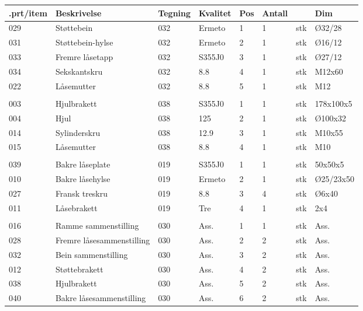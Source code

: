 \begin{tabular}{|l|l|l|l|l|l|l|l|}
\hline
\bf{.prt/item} & \bf{Beskrivelse} & \bf{Tegning} & \bf{Kvalitet} & \bf{Pos} & \bf{Antall} &  & \bf{Dim}\\ \hline
029 & Støttebein & 032 & Ermeto & 1 & 1 & stk & Ø32/28\\ \hline
031 & Støttebein-hylse & 032 & Ermeto & 2 & 1 & stk & Ø16/12\\ \hline
033 & Fremre låsetapp & 032 & S355J0 & 3 & 1 & stk & Ø27/12\\ \hline
034 & Sekskantskru & 032 & 8.8 & 4 & 1 & stk & M12x60\\ \hline
022 & Låsemutter & 032 & 8.8 & 5 & 1 & stk & M12\\ \hline
 &  &  &  &  &  &  & \\ \hline
003 & Hjulbrakett & 038 & S355J0 & 1 & 1 & stk & 178x100x5\\ \hline
004 & Hjul & 038 & 125 & 2 & 1 & stk & Ø100x32\\ \hline
014 & Sylinderskru & 038 & 12.9 & 3 & 1 & stk & M10x55\\ \hline
015 & Låsemutter & 038 & 8.8 & 4 & 1 & stk & M10\\ \hline
 &  &  &  &  &  &  & \\ \hline
039 & Bakre låseplate & 019 & S355J0 & 1 & 1 & stk & 50x50x5\\ \hline
010 & Bakre låsehylse & 019 & Ermeto & 2 & 1 & stk & Ø25/23x50\\ \hline
027 & Fransk treskru & 019 & 8.8 & 3 & 4 & stk & Ø6x40\\ \hline
011 & Låsebrakett & 019 & Tre & 4 & 1 & stk & 2x4\\ \hline
 &  &  &  &  &  &  & \\ \hline
016 & Ramme sammenstilling & 030 & Ass. & 1 & 1 & stk & Ass.\\ \hline
028 & Fremre låsesammenstilling & 030 & Ass. & 2 & 2 & stk & Ass.\\ \hline
032 & Bein sammenstilling & 030 & Ass. & 3 & 2 & stk & Ass.\\ \hline
012 & Støttebrakett & 030 & Ass. & 4 & 2 & stk & Ass.\\ \hline
038 & Hjulbrakett & 030 & Ass. & 5 & 2 & stk & Ass.\\ \hline
040 & Bakre låsesammenstilling & 030 & Ass. & 6 & 2 & stk & Ass.\\ \hline
\end{tabular}
